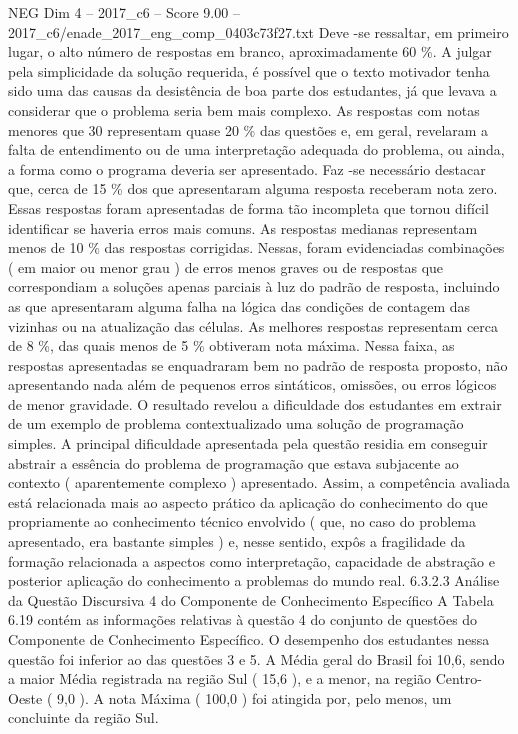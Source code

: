 \begin{textsample}{NEG Dim 4 – 2017\_c6 – Score 9.00 – 2017\_c6/enade\_2017\_eng\_comp\_0403c73f27.txt}
Deve -se ressaltar, em primeiro lugar, o alto número de respostas em branco, aproximadamente 60 \%.
A julgar pela simplicidade da solução requerida, é possível que o texto motivador tenha sido uma das causas da desistência de boa parte dos estudantes, já que levava a considerar que o problema seria bem mais complexo.
As respostas com notas menores que 30 representam quase 20 \% das questões e, em geral, revelaram a falta de entendimento ou de uma interpretação adequada do problema, ou ainda, a forma como o programa deveria ser apresentado.
Faz -se necessário destacar que, cerca de 15 \% dos que apresentaram alguma resposta receberam nota zero.
Essas respostas foram apresentadas de forma tão incompleta que tornou difícil identificar se haveria erros mais comuns.
As respostas medianas representam menos de 10 \% das respostas corrigidas.
Nessas, foram evidenciadas combinações ( em maior ou menor grau ) de erros menos graves ou de respostas que correspondiam a soluções apenas parciais à luz do padrão de resposta, incluindo as que apresentaram alguma falha na lógica das condições de contagem das vizinhas ou na atualização das células.
As melhores respostas representam cerca de 8 \%, das quais menos de 5 \% obtiveram nota máxima.
Nessa faixa, as respostas apresentadas se enquadraram bem no padrão de resposta proposto, não apresentando nada além de pequenos erros sintáticos, omissões, ou erros lógicos de menor gravidade.
O resultado revelou a dificuldade dos estudantes em extrair de um exemplo de problema contextualizado uma solução de programação simples.
A principal dificuldade apresentada pela questão residia em conseguir abstrair a essência do problema de programação que estava subjacente ao contexto ( aparentemente complexo ) apresentado.
Assim, a competência avaliada está relacionada mais ao aspecto prático da aplicação do conhecimento do que propriamente ao conhecimento técnico envolvido ( que, no caso do problema apresentado, era bastante simples ) e, nesse sentido, expôs a fragilidade da formação relacionada a aspectos como interpretação, capacidade de abstração e posterior aplicação do conhecimento a problemas do mundo real. 6.3.2.3 Análise da Questão Discursiva 4 do Componente de Conhecimento Específico A Tabela 6.19 contém as informações relativas à questão 4 do conjunto de questões do Componente de Conhecimento Específico.
O desempenho dos estudantes nessa questão foi inferior ao das questões 3 e 5.
A Média geral do Brasil foi 10,6, sendo a maior Média registrada na região Sul ( 15,6 ), e a menor, na região Centro-Oeste ( 9,0 ).
A nota Máxima ( 100,0 ) foi atingida por, pelo menos, um concluinte da região Sul.

\end{textsample}
